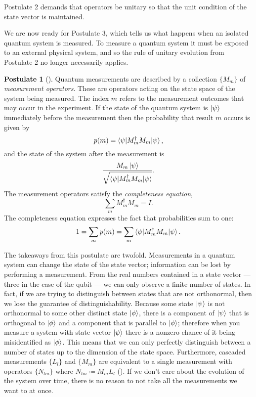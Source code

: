 \documentclass[12pt,twoside]{reedthesis}
\theoremstyle{plain}   %
\theoremstyle{definition}
\newtheorem{post}{Postulate}[section]
\theoremstyle{remark}
\numberwithin{equation}{section}
\begin{document}
  Postulate 2 demands that operators be unitary so that the unit condition of the state vector is maintained. \par
  We are now ready for Postulate 3, which tells us what happens when an isolated quantum system is measured.
  To measure a quantum system it must be exposed to an external physical system, and so the rule of unitary evolution from Postulate 2 no longer necessarily applies.
  \begin{post}[{\cite[2.2.3]{nielsen2010}}]
    Quantum measurements are described by a collection $\{M_m\}$ of \emph{measurement operators}.
    These are operators acting on the state space of the system being measured.
    The index $m$ refers to the measurement outcomes that may occur in the experiment.
    If the state of the quantum system is $\ket{\psi}$ immediately before the measurement then the probability that result $m$ occurs is given by
    \[ p(m) = \braket{ \psi | M_m^\dag M_m | \psi},\]
    and the state of the system after the measurement is
    \[ \dfrac{M_m \ket{\psi}}{\sqrt{\braket{\psi | M_m^\dag M_m | \psi}}}.\]
    The measurement operators satisfy the \emph{completeness equation},
    \[ \sum_m M_m^\dag M_m = I.\]
    The completeness equation expresses the fact that probabilities sum to one:
    \[ 1 = \sum_m p(m) = \sum_m \braket{\psi | M_m^\dag M_m | \psi}.\]
  \end{post}
  The takeaways from this postulate are twofold. Measurements in a quantum system can change the state of the state vector; information can be lost by performing a measurement.
  From the real numbers contained in a state vector --- three in the case of the qubit --- we can only observe a finite number of states.
  In fact, if we are trying to distinguish between states that are not orthonormal, then we lose the guarantee of distinguishability.
  Because some state $\ket{\psi}$ is not orthonormal to some other distinct state $\ket{\phi}$, there is a component of $\ket{\psi}$ that is orthogonal to $\ket{\phi}$ and a component
  that is parallel to $\ket{\phi}$; therefore when you measure a system with state vector $\ket{\psi}$ there is a nonzero chance of it being misidentified as $\ket{\phi}$.
  This means that we can only perfectly distinguish between a number of states up to the dimension of the state space.
  Furthermore, cascaded measurements $\{L_l \}$ and $\{M_m\}$ are equivalent to a single measurement with operators $\{N_{lm}\}$ where $N_{lm} \coloneq M_m L_l$ (\cite[2.57]{nielsen2010}).
  If we don't care about the evolution of the system over time, there is no reason to not take all the measurements we want to at once. \par
\end{document}
